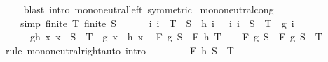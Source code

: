 \begin{isabellebody}
%
\isadelimproof
\ \ %
\endisadelimproof
%
\isatagproof
{}\isamarkupfalse%
\ {\isacharparenleft}{\kern0pt}blast\ intro{\isacharbang}{\kern0pt}{\isacharcolon}{\kern0pt}\ mono{\isacharunderscore}{\kern0pt}neutral{\isacharunderscore}{\kern0pt}left\ {\isacharbrackleft}{\kern0pt}symmetric{\isacharbrackright}{\kern0pt}{\isacharparenright}{\kern0pt}%
\endisatagproof
{\isafoldproof}%
%
\isadelimproof
\isanewline
%
\endisadelimproof
\isanewline
{}\isamarkupfalse%
\ mono{\isacharunderscore}{\kern0pt}neutral{\isacharunderscore}{\kern0pt}cong{\isacharcolon}{\kern0pt}\isanewline
\ \ \ {\isacharbrackleft}{\kern0pt}simp{\isacharbrackright}{\kern0pt}{\isacharcolon}{\kern0pt}\ {\isachardoublequoteopen}finite\ T{\isachardoublequoteclose}\ {\isachardoublequoteopen}finite\ S{\isachardoublequoteclose}\isanewline
\ \ \ \ \ {\isacharasterisk}{\kern0pt}{\isacharcolon}{\kern0pt}\ {\isachardoublequoteopen}{\isasymAnd}i{\isachardot}{\kern0pt}\ i\ {\isasymin}\ T\ {\isacharminus}{\kern0pt}\ S\ {\isasymLongrightarrow}\ h\ i\ {\isacharequal}{\kern0pt}\ \ {\isachardoublequoteopen}{\isasymAnd}i{\isachardot}{\kern0pt}\ i\ {\isasymin}\ S\ {\isacharminus}{\kern0pt}\ T\ {\isasymLongrightarrow}\ g\ i\ {\isacharequal}{\kern0pt}\ \isanewline
\ \ \ \ \ gh{\isacharcolon}{\kern0pt}\ {\isachardoublequoteopen}{\isasymAnd}x{\isachardot}{\kern0pt}\ x\ {\isasymin}\ S\ {\isasyminter}\ T\ {\isasymLongrightarrow}\ g\ x\ {\isacharequal}{\kern0pt}\ h\ x{\isachardoublequoteclose}\isanewline
\ \ {\isachardoublequoteopen}F\ g\ S\ {\isacharequal}{\kern0pt}\ F\ h\ T{\isachardoublequoteclose}\isanewline
%
\isadelimproof
%
\endisadelimproof
%
\isatagproof
{}\isamarkupfalse%
{\isacharminus}{\kern0pt}\isanewline
\ \ \isamarkupfalse%
\ {\isachardoublequoteopen}F\ g\ S\ {\isacharequal}{\kern0pt}\ F\ g\ {\isacharparenleft}{\kern0pt}S\ {\isasyminter}\ T{\isacharparenright}{\kern0pt}{\isachardoublequoteclose}\isanewline
\ \ \ \ \isamarkupfalse%
{\isacharparenleft}{\kern0pt}rule\ mono{\isacharunderscore}{\kern0pt}neutral{\isacharunderscore}{\kern0pt}right{\isacharparenright}{\kern0pt}{\isacharparenleft}{\kern0pt}auto\ intro{\isacharcolon}{\kern0pt}\ {\isacharasterisk}{\kern0pt}{\isacharparenright}{\kern0pt}\isanewline
\ \ \isamarkupfalse%
\ \isamarkupfalse%
\ {\isachardoublequoteopen}{\isasymdots}\ {\isacharequal}{\kern0pt}\ F\ h\ {\isacharparenleft}{\kern0pt}S\ {\isasyminter}\ T{\isacharparenright}{\kern0pt}{\isachardoublequoteclose}\ \isamarkupfalse%

\end{isabellebody}
